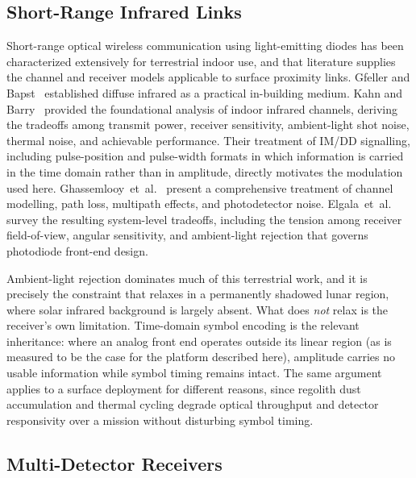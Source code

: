 \subsection{Short-Range Infrared Links}

Short-range optical wireless communication using light-emitting diodes has been
characterized extensively for terrestrial indoor use, and that literature
supplies the channel and receiver models applicable to surface proximity links.
Gfeller and Bapst~\cite{Gfeller1979} established diffuse infrared as a
practical in-building medium. Kahn and Barry~\cite{Kahn1997} provided the
foundational analysis of indoor infrared channels, deriving the tradeoffs among
transmit power, receiver sensitivity, ambient-light shot noise, thermal noise,
and achievable performance. Their treatment of IM/DD signalling, including
pulse-position and pulse-width formats in which information is carried in the
time domain rather than in amplitude, directly motivates the modulation used
here. Ghassemlooy~et~al.~\cite{Ghassemlooy2012} present a comprehensive
treatment of channel modelling, path loss, multipath effects, and photodetector
noise. Elgala~et~al.~\cite{Elgala2011} survey the resulting system-level
tradeoffs, including the tension among receiver field-of-view, angular
sensitivity, and ambient-light rejection that governs photodiode front-end
design.

Ambient-light rejection dominates much of this terrestrial work, and it is
precisely the constraint that relaxes in a permanently shadowed lunar region,
where solar infrared background is largely absent. What does \emph{not} relax
is the receiver's own limitation. Time-domain symbol encoding is the relevant
inheritance: where an analog front end operates outside its linear region (as
is measured to be the case for the platform described here), amplitude carries
no usable information while symbol timing remains intact. The same argument
applies to a surface deployment for different reasons, since regolith dust
accumulation and thermal cycling degrade optical throughput and detector
responsivity over a mission without disturbing symbol timing.

\subsection{Multi-Detector Receivers}

